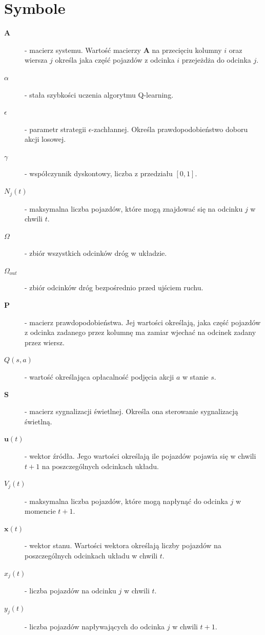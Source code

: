 \documentclass[12pt]{book}
\theoremstyle{plain}
\begin{document}
\section*{Symbole}
\begin{description}
	\item[$\textbf{A}$] - macierz systemu.  Wartość macierzy $\textbf{A}$ na przecięciu kolumny $i$ oraz wiersza $j$ określa jaka część pojazdów z odcinka $i$ przejeżdża do odcinka $j$.
	\item[$\alpha$] - stała szybkości uczenia algorytmu Q-learning.
	\item[$\epsilon$] - parametr strategii $\epsilon$-zachłannej. Określa prawdopodobieństwo doboru akcji losowej.
	\item[$\gamma$] - współczynnik dyskontowy, liczba z przedziału $[0,1]$.
	\item[$N_j(t)$] - maksymalna liczba pojazdów, które mogą znajdować się na odcinku $j$ w chwili $t$.
	\item[$\Omega$] - zbiór wszystkich odcinków dróg w układzie.
	\item[$\Omega_{out}$] - zbiór odcinków dróg bezpośrednio przed ujściem ruchu.
	\item[$\textbf{P}$] - macierz prawdopodobieństwa. Jej wartości określają, jaka część pojazdów z odcinka zadanego przez kolumnę ma zamiar wjechać na odcinek zadany przez wiersz.
	\item[$Q(s,a)$] - wartość określająca opłacalność podjęcia akcji $a$ w stanie $s$.
	\item[$\textbf{S}$] - macierz sygnalizacji świetlnej. Określa ona sterowanie sygnalizacją świetlną. 
	\item[$\textbf{u}(t)$] - wektor źródła. Jego wartości określają ile pojazdów pojawia się w chwili $t+1$ na poszczególnych odcinkach układu.
	\item[$V_j(t)$] - maksymalna liczba pojazdów, które mogą napłynąć do odcinka $j$ w momencie $t+1$.
	\item[$\textbf{x}(t)$] - wektor stanu. Wartości wektora określają liczby pojazdów na poszczególnych odcinkach układu w chwili $t$.
	\item[$x_j(t)$] - liczba pojazdów na odcinku $j$ w chwili $t$.
	\item[$y_j(t)$] - liczba pojazdów napływających do odcinka $j$ w chwili $t+1$.
\end{description}
\end{document}
